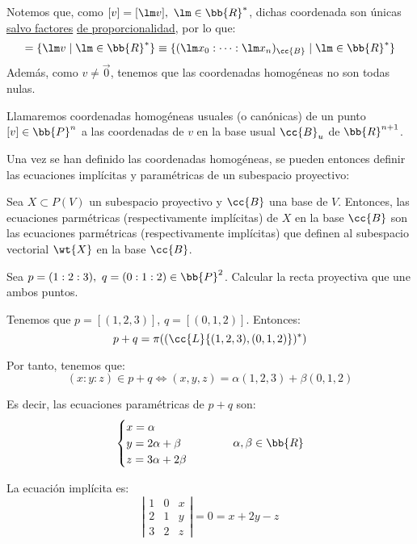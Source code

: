 Notemos que, como $[v]=[\lm v],~\lm \in \bb{R}^\ast$, dichas coordenada son únicas \ul{salvo factores} \ul{de proporcionalidad},
por lo que:
\begin{equation*}
    [v] = \{\lm v \mid \lm \in \bb{R}^\ast\} \equiv \{(\lm x_0:\dots :\lm x_n)_{\cc{B}} \mid \lm \in \bb{R}^\ast\}
\end{equation*}
Además, como $v\neq \vec{0}$, tenemos que las coordenadas homogéneas no son todas nulas.

\begin{definicion}
    Llamaremos coordenadas homogéneas usuales (o canónicas) de un punto $[v]\in \bb{P}^n$ a las coordenadas de $v$ en la base usual $\cc{B}_u$ de $\bb{R}^{n+1}$.
\end{definicion}


Una vez se han definido las coordenadas homogéneas, se pueden entonces definir las ecuaciones implícitas y paramétricas de un subespacio proyectivo:
\begin{definicion}
    Sea $X\subset P(V)$ un subespacio proyectivo y $\cc{B}$ una base de $V$.
    Entonces, las ecuaciones parmétricas (respectivamente implícitas) de $X$ en la base $\cc{B}$ son las ecuaciones parmétricas (respectivamente implícitas) que definen al subespacio vectorial $\wt{X}$ en la base $\cc{B}$.
\end{definicion}
\begin{ejemplo}
    Sea $p=(1:2:3),~q=(0:1:2)\in \bb{P}^2$. Calcular la recta proyectiva que une ambos puntos.

    Tenemos que $p=[(1,2,3)]$, $q=[(0,1,2)]$. Entonces:
    \begin{equation*}
        p+q = \pi((\cc{L}\{(1,2,3), (0,1,2)\})^\ast)
    \end{equation*}

    Por tanto, tenemos que:
    \begin{equation*}
        (x:y:z)\in p+q \Longleftrightarrow (x,y,z)=\alpha(1,2,3) + \beta(0,1,2)
    \end{equation*}

    Es decir, las ecuaciones paramétricas de $p+q$ son:
    \begin{equation*}
        \begin{cases}
            x = \alpha\\
            y = 2\alpha + \beta\\
            z = 3\alpha + 2\beta
        \end{cases} \hspace{1cm} \alpha,\beta \in \bb{R}
    \end{equation*}

    La ecuación implícita es:
    \begin{equation*}
        \left|\begin{array}{ccc}
            1 & 0 & x \\
            2 & 1 & y\\
            3 & 2 & z
        \end{array}\right| = 0 = x+2y-z
    \end{equation*}
\end{ejemplo}


